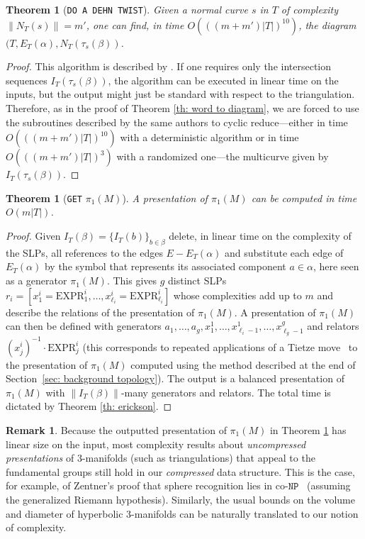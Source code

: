 \documentclass[11pt]{amsart}
\numberwithin{equation}{section}
\theoremstyle{plain}
\newtheorem{theorem}[equation]{Theorem}
\theoremstyle{definition}
\newtheorem{remark}[equation]{Remark}
\begin{document}
\begin{theorem}[\texttt{DO A DEHN TWIST}]\label{th: do a dehn twist}
    Given a normal curve $s$ in $T$ of complexity $\|N_T(s)\|=m'$, one can find, in time $O(((m+m')|T|)^{10})$, the diagram $(T,E_T(\alpha),N_T(\tau_s(\beta))$.
\end{theorem}
\begin{proof}
    This algorithm is described by \cite{schaefer2008computing, Stefankovic}. 
    If one requires only the intersection sequences $I_T(\tau_s(\beta))$, the algorithm can be executed in linear time on the inputs, but the output might just be standard with respect to the triangulation. 
    Therefore, as in the proof of Theorem \ref{th: word to diagram}, we are forced to use the subroutines described by the same authors to cyclic reduce---either in time $O(((m+m')|T|)^{10})$ with a deterministic algorithm or in time $O(((m+m')|T|)^{3})$ with a randomized one---the multicurve given by $I_T(\tau_s(\beta))$.
\end{proof}


\begin{theorem}[\texttt{GET} \texorpdfstring{$\pi_1(M)$}{pi1(M)}]\label{th: get pi1}
    A presentation of $\pi_1(M)$ can be computed in time $O(m|T|)$.
\end{theorem}
\begin{proof}
    Given $I_T(\beta)=\{I_T(b)\}_{b\in\beta}$ delete, in linear time on the complexity of the SLPs, all references to the edges $E-E_T(\alpha)$ and substitute each edge of $E_T(\alpha)$ by the symbol that represents its associated component $a\in \alpha$, here seen as a generator $\pi_1(M)$.
    This gives $g$ distinct SLPs $r_i = [x_1^i=\text{EXPR}_1^i,\dots, x_{\ell_i}^i=\text{EXPR}_{\ell_i}^i]$ whose complexities add up to $m$ and describe the relations of the presentation of $\pi_1(M)$.
    A presentation of $\pi_1(M)$ can then be defined with generators $a_1,\dots, a_g, x_1^1,\dots, x_{\ell_i-1}^1,\dots, x_{\ell_{g}-1}^g$ and relators $(x_j^i)^{-1}\cdot \text{EXPR}_j^i$ (this corresponds to repeated applications of a Tietze move~\cite{johnson1997presentations} to the presentation of $\pi_1(M)$ computed using the method described at the end of Section~\ref{sec: background topology}).
    The output is a balanced presentation of $\pi_1(M)$ with $\|I_T(\beta)\|$-many generators and relators. 
    The total time is dictated by Theorem \ref{th: erickson}.  
\end{proof}

\begin{remark}\label{rm: co-NP}
    Because the outputted presentation of $\pi_1(M)$ in Theorem \ref{th: get pi1} has linear size on the input, most complexity results about \emph{uncompressed presentations} of 3-manifolds (such as triangulations) that appeal to the fundamental groups still hold in our \emph{compressed} data structure. 
    This is the case, for example, of Zentner's proof that sphere recognition lies in co-$\texttt{NP}$~\cite{Zentner_2018} (assuming the generalized Riemann hypothesis).
    Similarly, the usual bounds on the volume \cite{cooper1999volume} and diameter \cite{white2001diameter} of hyperbolic 3-manifolds can be naturally translated to our notion of complexity.
\end{remark}
\end{document}
